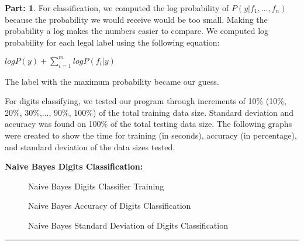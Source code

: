 \documentclass{article}
\theoremstyle{definition}
\def\fline{\rule{0.75\linewidth}{0.5pt}}
\newcommand{\finishline}{\begin{center}\fline\end{center}}
\newtheorem*{solution*}{Part: }
\newenvironment{solution}{\begin{solution*}}{{\finishline} \end{solution*}}
\begin{document}
\begin{solution}
\item For classification, we computed the log probability of $P(y|f_1, ..., f_n)$ because the probability we would receive would be too small. Making the probability a log makes the numbers easier to compare. We computed log probability for each legal label using the following equation:
\item $log P(y) + \sum_{i=1}^{m}{logP(f_i|y)}$
\item The label with the maximum probability became our guess.
\item For digits classifying, we tested our program through increments of 10\% (10\%, 20\%, 30\%,..., 90\%, 100\%) of the total training data size. Standard deviation and accuracy was found on 100\% of the total testing data size. The following graphs were created to show the time for training (in seconds), accuracy (in percentage), and standard deviation of the data sizes tested.
\begin{newpage}
\end{newpage}
\item \textbf{Naive Bayes Digits Classification:}
\begin{figure}[h!]
            \centering
            \item 
            \caption{Naive Bayes Digits Classifier Training}
        \end{figure}

\item
\begin{figure}[h!]
            \centering
            \item 
            \caption{Naive Bayes Accuracy of Digits Classification}
        \end{figure}
        
\item
\begin{figure}[h!]
            \centering
            \item 
            \caption{Naive Bayes Standard Deviation of Digits Classification}
        \end{figure}

\begin{newpage}
\end{newpage}


\end{solution}
\end{document}
